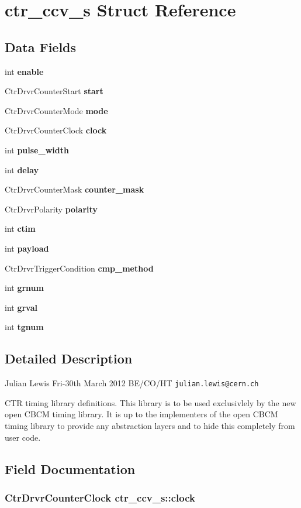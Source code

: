 \section{ctr\_\-ccv\_\-s Struct Reference}
\label{structctr__ccv__s}
\subsection*{Data Fields}
\begin{CompactItemize}
\item 
int \bf{enable}
\item 
Ctr\-Drvr\-Counter\-Start \bf{start}
\item 
Ctr\-Drvr\-Counter\-Mode \bf{mode}
\item 
Ctr\-Drvr\-Counter\-Clock \bf{clock}
\item 
int \bf{pulse\_\-width}
\item 
int \bf{delay}
\item 
Ctr\-Drvr\-Counter\-Mask \bf{counter\_\-mask}
\item 
Ctr\-Drvr\-Polarity \bf{polarity}
\item 
int \bf{ctim}
\item 
int \bf{payload}
\item 
Ctr\-Drvr\-Trigger\-Condition \bf{cmp\_\-method}
\item 
int \bf{grnum}
\item 
int \bf{grval}
\item 
int \bf{tgnum}
\end{CompactItemize}


\subsection{Detailed Description}
Julian Lewis Fri-30th March 2012 BE/CO/HT \tt{julian.lewis@cern.ch}

CTR timing library definitions. This library is to be used exclusivlely by the new open CBCM timing library. It is up to the implementers of the open CBCM timing library to provide any abstraction layers and to hide this completely from user code. 



\subsection{Field Documentation}
\subsubsection{\setlength{\rightskip}{0pt plus 5cm}Ctr\-Drvr\-Counter\-Clock \bf{ctr\_\-ccv\_\-s::clock}}\label{structctr__ccv__s_21600753bb75f8ce9a9eb77a47fa2932}


